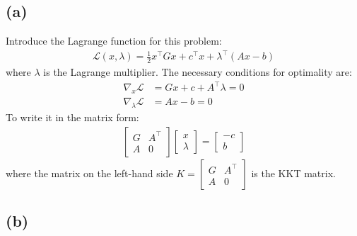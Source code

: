 \documentclass[12pt]{article}
\begin{document}
\subsection*{(a)}

Introduce the Lagrange function for this problem:
\begin{align*}
    \mathscr{L}(x, \lambda) = \frac{1}{2}x^\top Gx + c^\top x + \lambda^\top(Ax - b)
\end{align*}
where $\lambda$  is the Lagrange multiplier. The necessary conditions for optimality are:
\begin{align*}
    \nabla_x \mathscr{L}&=G x+c+A^{\top} \lambda=0 \\
    \nabla_\lambda \mathscr{L}&=A x-b=0
\end{align*}
To write it in the matrix form:
\begin{align*}
    \left[\begin{array}{cc}
        G & A^\top \\
        A & 0
        \end{array}\right]\left[\begin{array}{c}
        x \\
        \lambda
        \end{array}\right]=\left[\begin{array}{c}
        -c \\
        b
        \end{array}\right]
\end{align*}
where the matrix on the left-hand side $\displaystyle K = \left[\begin{array}{cc}
    G & A^\top \\
    A & 0
    \end{array}\right]$ is the KKT matrix. 

\subsection*{(b)}
\end{document}
